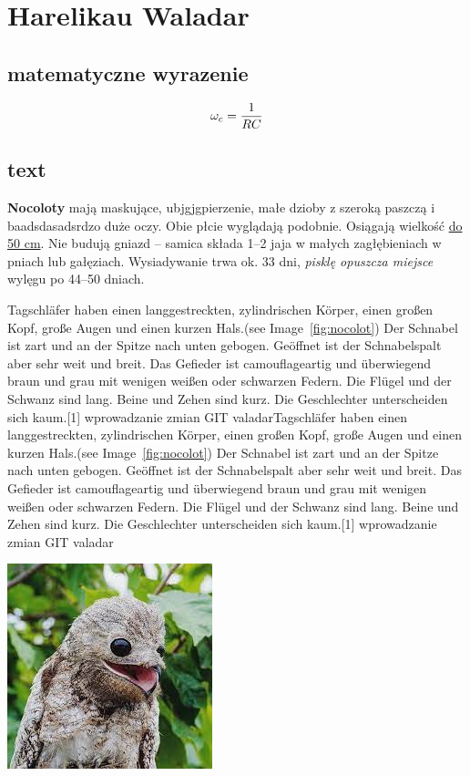 

\newpage
\section{Harelikau Waladar}
\label{sec:text_vharelikau}

\subsection{matematyczne wyrazenie}
    \begin{equation}
              \omega_c = \frac{1}{RC}\\
    \end{equation}

\subsection{text}
    \begin{flushleft}
         \textbf{Nocoloty} mają maskujące,  ubjgjgpierzenie, małe dzioby z szeroką paszczą i baadsdasadsrdzo duże oczy. Obie płcie wyglądają podobnie. Osiągają wielkość \underline{do 50 cm}. Nie budują gniazd – samica składa 1–2 jaja w małych zagłębieniach w pniach lub gałęziach. Wysiadywanie trwa ok. 33 dni, \textit{pisklę opuszcza miejsce} wylęgu po 44–50 dniach. \par Tagschläfer haben einen langgestreckten, zylindrischen Körper, einen großen Kopf, große Augen und einen kurzen Hals.(see Image~\ref{fig:nocolot}) Der Schnabel ist zart und an der Spitze nach unten gebogen. Geöffnet ist der Schnabelspalt aber sehr weit und breit. Das Gefieder ist camouflageartig und überwiegend braun und grau mit wenigen weißen oder schwarzen Federn. Die Flügel und der Schwanz sind lang. Beine und Zehen sind kurz. Die Geschlechter unterscheiden sich kaum.[1]
        wprowadzanie zmian GIT valadarTagschläfer haben einen langgestreckten, zylindrischen Körper, einen großen Kopf, große Augen und einen kurzen Hals.(see Image~\ref{fig:nocolot}) Der Schnabel ist zart und an der Spitze nach unten gebogen. Geöffnet ist der Schnabelspalt aber sehr weit und breit. Das Gefieder ist camouflageartig und überwiegend braun und grau mit wenigen weißen oder schwarzen Federn. Die Flügel und der Schwanz sind lang. Beine und Zehen sind kurz. Die Geschlechter unterscheiden sich kaum.[1]
        wprowadzanie zmian GIT valadar

             \centering
             \includegraphics{pictures/nocolot.jpg}
             \label{fig:nocolot}
         
\end{flushleft}
